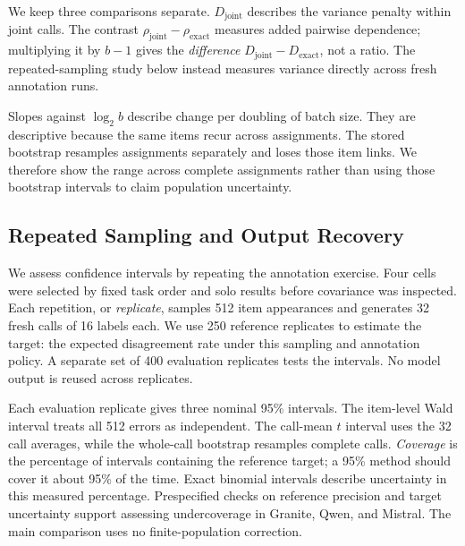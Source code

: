 \documentclass[conference]{IEEEtran}
\newcommand{\joint}{\mathrm{joint}}
\newcommand{\exact}{\mathrm{exact}}
\begin{document}
We keep three comparisons separate. $D_\joint$ describes the variance penalty within joint calls. The contrast $\rho_\joint-\rho_\exact$ measures added pairwise dependence; multiplying it by $b-1$ gives the \emph{difference} $D_\joint-D_\exact$, not a ratio. The repeated-sampling study below instead measures variance directly across fresh annotation runs.

Slopes against $\log_2 b$ describe change per doubling of batch size. They are descriptive because the same items recur across assignments. The stored bootstrap resamples assignments separately and loses those item links. We therefore show the range across complete assignments rather than using those bootstrap intervals to claim population uncertainty.

\begin{table}[t]
\caption{Error rates and excess covariance at batch size 16. Lower error rates mean better label accuracy. Positive excess covariance means more errors occur together in joint calls. Error rates use resolved targets; replay ranges concern only regrouping of saved outputs (Section~III-B).}
\label{tab:grid}
\centering
\small
\setlength{\tabcolsep}{6pt}

\end{table}

\subsection{Repeated Sampling and Output Recovery}
We assess confidence intervals by repeating the annotation exercise. Four cells were selected by fixed task order and solo results before covariance was inspected. Each repetition, or \emph{replicate}, samples 512 item appearances and generates 32 fresh calls of 16 labels each. We use 250 reference replicates to estimate the target: the expected disagreement rate under this sampling and annotation policy. A separate set of 400 evaluation replicates tests the intervals. No model output is reused across replicates.

Each evaluation replicate gives three nominal 95\% intervals. The item-level Wald interval treats all 512 errors as independent. The call-mean $t$ interval uses the 32 call averages, while the whole-call bootstrap resamples complete calls. \emph{Coverage} is the percentage of intervals containing the reference target; a 95\% method should cover it about 95\% of the time. Exact binomial intervals describe uncertainty in this measured percentage. Prespecified checks on reference precision and target uncertainty support assessing undercoverage in Granite, Qwen, and Mistral. The main comparison uses no finite-population correction.
\end{document}

